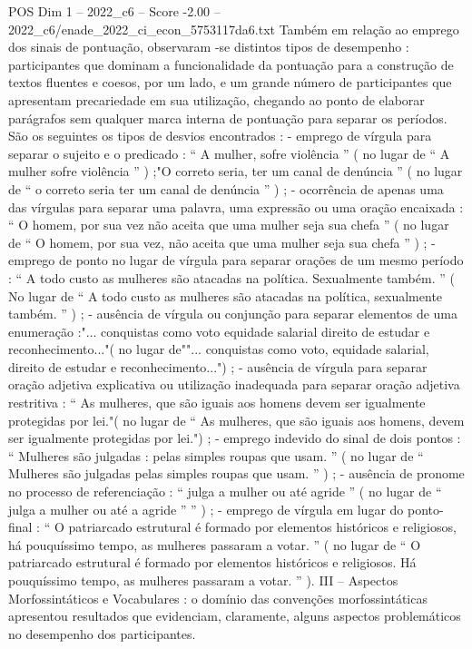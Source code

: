 \begin{textsample}{POS Dim 1 – 2022\_c6 – Score -2.00 – 2022\_c6/enade\_2022\_ci\_econ\_5753117da6.txt}
Também em relação ao emprego dos sinais de pontuação, observaram -se distintos tipos de desempenho : participantes que dominam a funcionalidade da pontuação para a construção de textos fluentes e coesos, por um lado, e um grande número de participantes que apresentam precariedade em sua utilização, chegando ao ponto de elaborar parágrafos sem qualquer marca interna de pontuação para separar os períodos.
São os seguintes os tipos de desvios encontrados : - emprego de vírgula para separar o sujeito e o predicado : “ A mulher, sofre violência ” ( no lugar de “ A mulher sofre violência ” ) ;"O correto seria, ter um canal de denúncia ” ( no lugar de “ o correto seria ter um canal de denúncia ” ) ; - ocorrência de apenas uma das vírgulas para separar uma palavra, uma expressão ou uma oração encaixada : “ O homem, por sua vez não aceita que uma mulher seja sua chefa ” ( no lugar de “ O homem, por sua vez, não aceita que uma mulher seja sua chefa ” ) ; - emprego de ponto no lugar de vírgula para separar orações de um mesmo período : “ A todo custo as mulheres são atacadas na política.
Sexualmente também. ” ( No lugar de “ A todo custo as mulheres são atacadas na política, sexualmente também. ” ) ; - ausência de vírgula ou conjunção para separar elementos de uma enumeração :"... conquistas como voto equidade salarial direito de estudar e reconhecimento..."( no lugar de""... conquistas como voto, equidade salarial, direito de estudar e reconhecimento...") ; - ausência de vírgula para separar oração adjetiva explicativa ou utilização inadequada para separar oração adjetiva restritiva : “ As mulheres, que são iguais aos homens devem ser igualmente protegidas por lei."( no lugar de “ As mulheres, que são iguais aos homens, devem ser igualmente protegidas por lei.") ; - emprego indevido do sinal de dois pontos : “ Mulheres são julgadas : pelas simples roupas que usam. ” ( no lugar de “ Mulheres são julgadas pelas simples roupas que usam. ” ) ; - ausência de pronome no processo de referenciação : “ julga a mulher ou até agride ” ( no lugar de “ julga a mulher ou até a agride ” ” ) ; - emprego de vírgula em lugar do ponto-final : “ O patriarcado estrutural é formado por elementos históricos e religiosos, há pouquíssimo tempo, as mulheres passaram a votar. ” ( no lugar de “ O patriarcado estrutural é formado por elementos históricos e religiosos.
Há pouquíssimo tempo, as mulheres passaram a votar. ” ).
III – Aspectos Morfossintáticos e Vocabulares : o domínio das convenções morfossintáticas apresentou resultados que evidenciam, claramente, alguns aspectos problemáticos no desempenho dos participantes.

\end{textsample}
